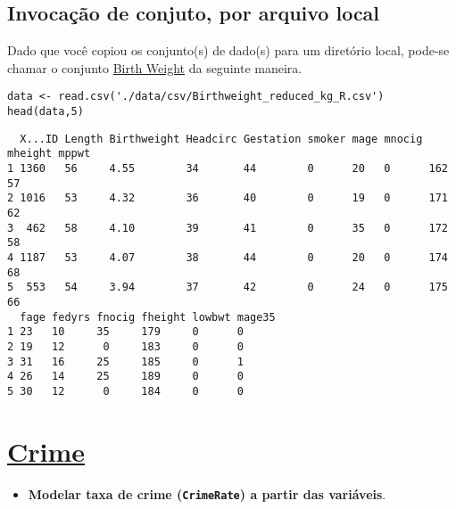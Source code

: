 \documentclass[12pt]{abntex2}
\begin{document}
\subsection{Invocação de conjuto, por arquivo local}
\label{sec:org75e9aa6}

Dado que você copiou os conjunto(s) de dado(s) para um diretório
local, pode-se chamar o conjunto \href{https://drive.google.com/file/d/1xv2lCPsj04FjGPQ\_BgPS9mrTIjBcyHQk/view?usp=sharing}{Birth Weight} da seguinte maneira.

\begin{verbatim}
data <- read.csv('./data/csv/Birthweight_reduced_kg_R.csv')
head(data,5)
\end{verbatim}

\begin{verbatim}
  X...ID Length Birthweight Headcirc Gestation smoker mage mnocig mheight mppwt
1 1360   56     4.55        34       44        0      20   0      162     57   
2 1016   53     4.32        36       40        0      19   0      171     62   
3  462   58     4.10        39       41        0      35   0      172     58   
4 1187   53     4.07        38       44        0      20   0      174     68   
5  553   54     3.94        37       42        0      24   0      175     66   
  fage fedyrs fnocig fheight lowbwt mage35
1 23   10     35     179     0      0     
2 19   12      0     183     0      0     
3 31   16     25     185     0      1     
4 26   14     25     189     0      0     
5 30   12      0     184     0      0     
\end{verbatim}

\section{\href{https://www.sheffield.ac.uk/mash/statistics/datasets}{Crime}}
\label{sec:orgb32a1b8}
\begin{itemize}
\item \textbf{Modelar taxa de crime (\texttt{CrimeRate}) a partir das variáveis}.
\end{itemize}
\end{document}
